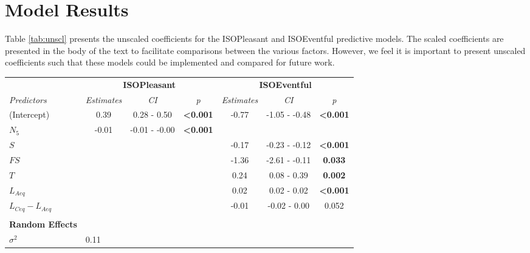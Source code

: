 \section{Model Results}
\label{app:mod}
Table \ref{tab:unscl} presents the unscaled coefficients for the ISOPleasant and ISOEventful predictive models. The scaled coefficients are presented in the body of the text to facilitate comparisons between the various factors. However, we feel it is important to present unscaled coefficients such that these models could be implemented and compared for future work. 


\begin{table*}[!ht]
\centering
\caption{Unscaled linear regression models of ISOPleasant and ISOEventful for 13 locations in London and Venice.}
\label{tab:unscl}
\def\arraystretch{.5}
\begin{tabular}{@{}l|lccccc@{}}
\toprule
\multicolumn{1}{l|}{} &
  \multicolumn{3}{c}{\textbf{ISOPleasant}} &
  \multicolumn{3}{c}{\textbf{ISOEventful}} \\
\textit{Predictors} &
  \multicolumn{1}{c}{\textit{Estimates}} &
  \textit{CI} &
  \textit{p} &
  \textit{Estimates} &
  \textit{CI} &
  \textit{p} \\ \midrule
(Intercept) &
  \multicolumn{1}{c}{0.39} &
  0.28 - 0.50 &
  \textbf{\textless{}0.001} &
  -0.77 &
  -1.05 - -0.48 &
  \textbf{\textless{}0.001} \\
$N_5$ &
  \multicolumn{1}{c}{-0.01} &
  -0.01 - -0.00 &
  \textbf{\textless{}0.001} &
  &
  &
  \\
$S$ &
  \multicolumn{1}{c}{} &
  &
  &
  -0.17 &
  -0.23 - -0.12 &
  \textbf{\textless{}0.001} \\
$FS$ &
  \multicolumn{1}{c}{} &
  &
  &
  -1.36 &
  -2.61 - -0.11 &
  \textbf{0.033} \\
$T$ &
  \multicolumn{1}{c}{} &
  &
  &
  0.24 &
  0.08 - 0.39 &
  \textbf{0.002} \\
$L_{Aeq}$ &
  \multicolumn{1}{c}{} &
  &
  &
  0.02 &
  0.02 - 0.02 &
  \textbf{\textless{}0.001} \\
$L_{Ceq}-L_{Aeq}$ &
  \multicolumn{1}{c}{} &
  &
  &
  -0.01 &
  -0.02 - 0.00 &
  0.052 \\
  \\
\textbf{Random Effects} &     & \multicolumn{1}{l}{} & \multicolumn{1}{l}{} & \multicolumn{1}{l}{}    & \multicolumn{1}{l}{} & \multicolumn{1}{l}{} \\
$\sigma^2$ &
  0.11 &
  \multicolumn{1}{l}{} &
  \multicolumn{1}{l}{} &
  \multicolumn{1}{l}{} &
  \multicolumn{1}{l}{} &

\end{tabular}
\end{table*}
